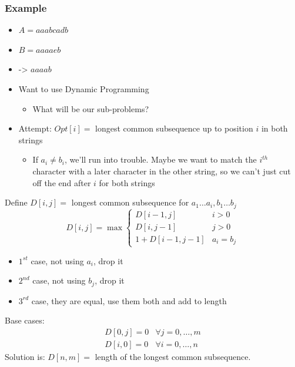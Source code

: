 \documentclass[11pt]{article}
\begin{document}
\subsubsection{Example}
\label{sec:orgd7268ff}
\begin{itemize}
\item \(A=aaabcadb\)
\item \(B=aaaaeb\)
\item -> \(aaaab\)
\item Want to use Dynamic Programming
\begin{itemize}
\item What will be our sub-problems?
\end{itemize}
\item Attempt: \(Opt[i] =\) longest common subsequence up to position \(i\) in both strings
\begin{itemize}
\item If \(a_i \neq b_i\), we'll run into trouble. Maybe we want to match the \(i^{th}\) character with a later character in the other string, so we can't just cut off the end after \(i\) for both strings
\end{itemize}
\end{itemize}
Define \(D[i,j]=\) longest common subsequence for \(a_1 \ldots a_i, b_1 \ldots b_j\)
\begin{equation*}
D[i,j] = \max 
\begin{cases}
D[i-1, j] & i>0
\\ D[i,j-1] & j>0
\\ 1+D[i-1,j-1] & a_i=b_j
\end{cases}
\end{equation*}
\begin{itemize}
\item \(1^{st}\) case, not using \(a_i\), drop it
\item \(2^{nd}\) case, not using \(b_j\), drop it
\item \(3^{rd}\) case, they are equal, use them both and add to length
\end{itemize}
Base cases: 
\begin{align*}
D[0,j]=0 & \forall j=0 , \ldots , m
\\ D[i,0]=0 & \forall i=0, \ldots, n
\end{align*}
Solution is: \(D[n,m] =\) length of the longest common subsequence.
\end{document}
